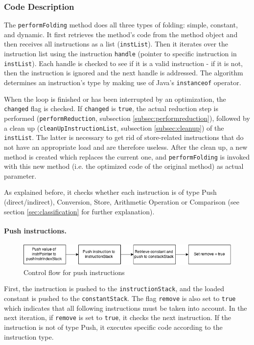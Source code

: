 \subsubsection{Code Description}
The \texttt{performFolding} method does all three types of folding: simple, constant, and dynamic. It first retrieves the method's code from the method object and then receives all instructions as a list (\texttt{instList}). Then it iterates over the instruction list using the instruction \texttt{handle} (pointer to specific instruction in \texttt{instList}). Each handle is checked to see if it is a valid instruction - if it is not, then the instruction is ignored and the next handle is addressed. The algorithm determines an instruction’s type by making use of Java's \texttt{instanceof} operator.

When the loop is finished or has been interrupted by an optimization, the \texttt{changed} flag is checked. If \texttt{changed} is \texttt{true}, the actual reduction step is performed (\texttt{performReduction}, subsection \ref{subsec:performreduction}), followed by a clean up (\texttt{cleanUpInstructionList}, subsection \ref{subsec:cleanup}) of the \texttt{instList}. The latter is necessary to get rid of store-related instructions that do not have an appropriate load and are therefore useless. After the clean up, a new method is created which replaces the current one, and \texttt{performFolding} is invoked with this new method (i.e. the optimized code of the original method) as actual parameter.

As explained before, it checks whether each instruction is of type Push (direct/indirect), Conversion, Store, Arithmetic Operation or Comparison (see section \ref{sec:classification} for further explanation).

\paragraph{Push instructions.}
\begin{figure}[h!]
\centering
\includegraphics[scale=0.7]{figures/push}
\caption{Control flow for push instructions}
\end{figure}
First, the instruction is pushed to the \texttt{instructionStack}, and the loaded constant is pushed to the \texttt{constantStack}. The flag \texttt{remove} is also set to \texttt{true} which indicates that all following instructions must be taken into account.     
In the next iteration, if \texttt{remove} is set to \texttt{true}, it checks the next instruction. If the instruction is not of type Push, it executes specific code according to the instruction type.

